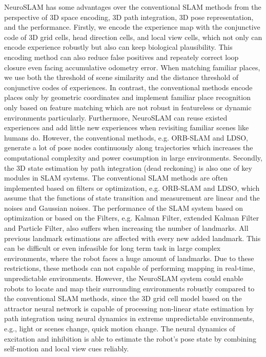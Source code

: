 NeuroSLAM has some advantages over the conventional SLAM methods from the perspective of 3D space encoding, 3D path integration, 3D pose representation, and the performance.
Firstly, we encode the experience map with the conjunctive code of 3D grid cells, head direction cells, and local view cells, which not only can encode experience robustly but also can keep biological plausibility.
This encoding method can also reduce false positives and repeately correct loop closure even facing accumulative odometry error.
When matching familiar places, we use both the threshold of scene similarity and the distance threshold of conjunctive codes of experiences.
In contrast, the conventional methods encode places only by geometric coordinates and implement familiar place recognition only based on feature matching which are not robust in featureless or dynamic environments particularly.
Furthermore, NeuroSLAM can reuse existed experiences and add little new experiences when revisiting familiar scenes like humans do.
However, the conventional methods, e.g. ORB-SLAM and LDSO, generate a lot of pose nodes continuously along trajectories which increases the computational complexity and power cosumption in large environments.
Secondly, the 3D state estimation by path integration (dead reckoning) is also one of key modules in SLAM systems.
The conventional SLAM methods are often implemented based on filters or optimization, e.g. ORB-SLAM and LDSO, which assume that the functions of state transition and measurement are linear and the noises and Gaussian noises.
The performance of the SLAM system based on optimization or based on the Filters, e.g. Kalman Filter, extended Kalman Filter and Particle Filter, also suffers when increasing the number of landmarks.
All previous landmark estimations are affected with every new added landmark.
This can be difficult or even infeasible for long term task in large complex environments, where the robot faces a huge amount of landmarks.
Due to these restrictions, these methods can not capable of performing mapping in real-time, unpredictable environments.
However, the NeuroSLAM system could enable robots to locate and map their surrounding environments robustly compared to the conventional SLAM methods, since the 3D grid cell model based on the attractor neural network is capable of processing non-linear state estimation by path integration using neural dynamics in extreme unpredictable environments, e.g., light or scenes change, quick motion change.
The neural dynamics of excitation and inhibition is able to estimate the robot's pose state by combining self-motion and local view cues reliably.
